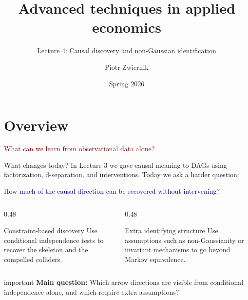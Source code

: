 \documentclass[dvipsnames,aspectratio=169,handout]{beamer}
\title{Advanced techniques in applied economics}
\subtitle{Lecture 4: Causal discovery and non-Gaussian identification}
\author{Piotr Zwiernik}
\date{Spring 2026}
\begin{document}

\begin{frame}
\titlepage
\end{frame}


\section{Overview}

\begin{frame}{}
\begin{center}
{\huge \textcolor{DarkRed}{What can we learn from observational data alone?}}
\end{center}
\end{frame}

\begin{frame}{What changes today?}
In Lecture 3 we gave causal meaning to DAGs using factorization, d-separation, and interventions.
Today we ask a harder question:
\begin{center}
\Large \textcolor{DarkBlue}{How much of the causal direction can be recovered without intervening?}
\end{center}

\begin{columns}[T]
\begin{column}{0.48\textwidth}
\begin{block}{Constraint-based discovery}
Use conditional independence tests to recover the skeleton and the compelled colliders.
\end{block}
\end{column}
\begin{column}{0.48\textwidth}
\begin{block}{Extra identifying structure}
Use assumptions such as non-Gaussianity or invariant mechanisms to go beyond Markov equivalence.
\end{block}
\end{column}
\end{columns}

\vspace{2mm}
\begin{beamercolorbox}[wd=\textwidth,sep=8pt,center,rounded=true,shadow=true]{important}
\textbf{Main question:}
Which arrow directions are visible from conditional independence alone, and which require extra assumptions?
\end{beamercolorbox}
\end{frame}
\end{document}
